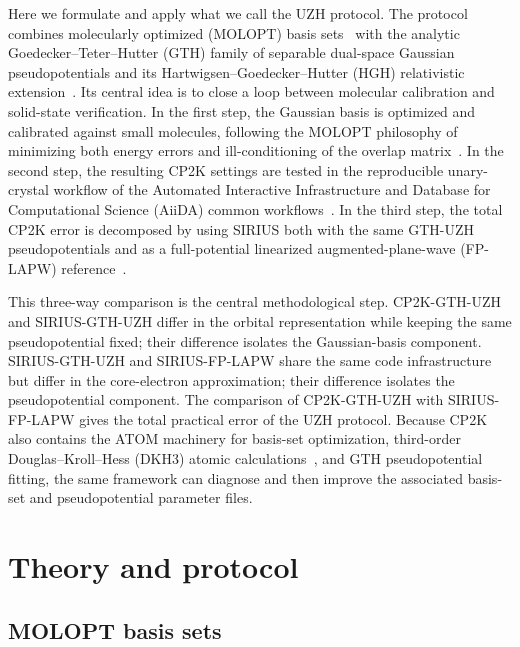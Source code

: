 \documentclass[aps,prb,reprint,amsmath,amssymb,superscriptaddress,longbibliography,floatfix]{revtex4-2}
\begin{document}
Here we formulate and apply what we call the UZH protocol. The protocol combines molecularly optimized (MOLOPT) basis sets~\cite{VandeVondele2007} with the analytic Goedecker--Teter--Hutter (GTH) family of separable dual-space Gaussian pseudopotentials and its Hartwigsen--Goedecker--Hutter (HGH) relativistic extension~\cite{Goedecker1996,Hartwigsen1998,Krack2005}. Its central idea is to close a loop between molecular calibration and solid-state verification. In the first step, the Gaussian basis is optimized and calibrated against small molecules, following the MOLOPT philosophy of minimizing both energy errors and ill-conditioning of the overlap matrix~\cite{VandeVondele2007}. In the second step, the resulting CP2K settings are tested in the reproducible unary-crystal workflow of the Automated Interactive Infrastructure and Database for Computational Science (AiiDA) common workflows~\cite{Huber2021,Bosoni2024}. In the third step, the total CP2K error is decomposed by using SIRIUS both with the same GTH-UZH pseudopotentials and as a full-potential linearized augmented-plane-wave (FP-LAPW) reference~\cite{Zhang2022Computation,Zhang2023Sirius,SiriusDocs}.

This three-way comparison is the central methodological step. CP2K-GTH-UZH and SIRIUS-GTH-UZH differ in the orbital representation while keeping the same pseudopotential fixed; their difference isolates the Gaussian-basis component. SIRIUS-GTH-UZH and SIRIUS-FP-LAPW share the same code infrastructure but differ in the core-electron approximation; their difference isolates the pseudopotential component. The comparison of CP2K-GTH-UZH with SIRIUS-FP-LAPW gives the total practical error of the UZH protocol. Because CP2K also contains the ATOM machinery for basis-set optimization, third-order Douglas--Kroll--Hess (DKH3) atomic calculations~\cite{DouglasKroll1974,Hess1986,NakajimaHirao2000}, and GTH pseudopotential fitting, the same framework can diagnose and then improve the associated basis-set and pseudopotential parameter files.

\section{Theory and protocol}

\subsection{MOLOPT basis sets}
\end{document}
